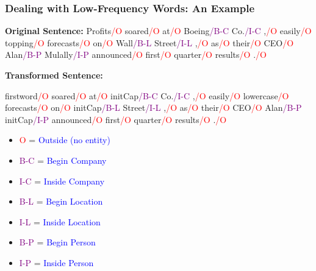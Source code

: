 \documentclass[handout]{beamer}
\begin{document}
\begin{frame}
  \frametitle{Dealing with Low-Frequency Words: An Example}
  \scriptsize
  
  
\textbf{Original Sentence:}
Profits\textcolor{red}{/O} soared\textcolor{red}{/O} at\textcolor{red}{/O} Boeing\textcolor{purple}{/B-C} Co.\textcolor{purple}{/I-C} ,\textcolor{red}{/O} easily\textcolor{red}{/O} topping\textcolor{red}{/O} forecasts\textcolor{red}{/O} on\textcolor{red}{/O} Wall\textcolor{purple}{/B-L} Street\textcolor{purple}{/I-L} ,\textcolor{red}{/O} as\textcolor{red}{/O} their\textcolor{red}{/O} CEO\textcolor{red}{/O} Alan\textcolor{purple}{/B-P} Mulally\textcolor{purple}{/I-P} announced\textcolor{red}{/O} first\textcolor{red}{/O} quarter\textcolor{red}{/O} results\textcolor{red}{/O} .\textcolor{red}{/O} \vspace{0.5cm}


\textbf{Transformed Sentence:}

firstword\textcolor{red}{/O} soared\textcolor{red}{/O} at\textcolor{red}{/O} initCap\textcolor{purple}{/B-C} Co.\textcolor{purple}{/I-C} ,\textcolor{red}{/O} easily\textcolor{red}{/O} lowercase\textcolor{red}{/O} forecasts\textcolor{red}{/O} on\textcolor{red}{/O} initCap\textcolor{purple}{/B-L} Street\textcolor{purple}{/I-L} ,\textcolor{red}{/O} as\textcolor{red}{/O} their\textcolor{red}{/O} CEO\textcolor{red}{/O} Alan\textcolor{purple}{/B-P} initCap\textcolor{purple}{/I-P} announced\textcolor{red}{/O} first\textcolor{red}{/O} quarter\textcolor{red}{/O} results\textcolor{red}{/O} .\textcolor{red}{/O} \vspace{0.5cm}


  \begin{itemize}
    \item \textcolor{red}{O} = \textcolor{blue}{Outside (no entity)}
    \item \textcolor{purple}{B-C} = \textcolor{blue}{Begin Company}
    \item \textcolor{purple}{I-C} = \textcolor{blue}{Inside Company}
    \item \textcolor{purple}{B-L} = \textcolor{blue}{Begin Location}
    \item \textcolor{purple}{I-L} = \textcolor{blue}{Inside Location}
    \item \textcolor{purple}{B-P} = \textcolor{blue}{Begin Person}
    \item \textcolor{purple}{I-P} = \textcolor{blue}{Inside Person}
  \end{itemize}
\end{frame}
\end{document}
